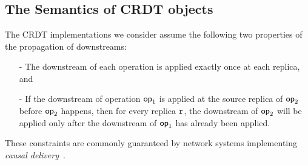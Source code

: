\section{\CRDTLin{}}
\label{sec:distributed-lin}




\subsection{The Semantics of CRDT objects}\label{ssec:semantics}


The CRDT implementations we consider assume the following two
properties of the propagation of downstreams:
\begin{itemize}
\setlength{\itemsep}{0.5pt}
\item[-] The downstream of each operation is applied exactly once at
  each replica, and
\item[-] If the downstream of operation $\mathsf{op}_1$ is applied at the
  source replica of $\mathsf{op}_2$ before $\mathsf{op}_2$ happens, then for every
  replica $\mathtt{r}$, the downstream of $\mathsf{op}_2$ will be applied only
  after the downstream of $\mathsf{op}_1$ has already been applied.
\end{itemize}
These constraints are commonly guaranteed by network systems
implementing \emph{causal delivery}~\cite{}.

